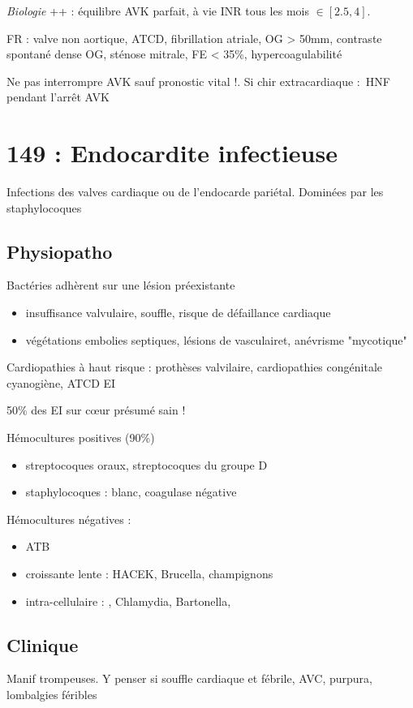 \textit{Biologie} ++ : équilibre AVK parfait, à vie \thus INR tous les mois $\in
[2.5, 4]$.

FR : valve non aortique, ATCD, fibrillation atriale, \diameter OG > 50mm,
contraste spontané dense OG, sténose mitrale, FE < 35\%, hypercoagulabilité

Ne pas interrompre AVK sauf pronostic vital !. Si chir extracardiaque : HNF
pendant l'arrêt AVK

\section{149 : Endocardite infectieuse}%
\label{sec:149_endocardite_infectieuse}
Infections des valves cardiaque ou de l'endocarde pariétal. Dominées par les
staphylocoques

\subsection{Physiopatho}
Bactéries adhèrent sur une lésion préexistante \thus
\begin{itemize}
  \item insuffisance valvulaire, souffle, risque de défaillance cardiaque
  \item végétations \thus embolies septiques, lésions de vasculairet, anévrisme
    "mycotique"
\end{itemize}

Cardiopathies à haut risque : prothèses valvilaire, cardiopathies congénitale
cyanogiène, ATCD EI

50\% des EI sur c\oe{}ur présumé sain !

Hémocultures positives (90\%)
\begin{itemize}
  \item streptocoques oraux, streptocoques du groupe D
  \item staphylocoques : blanc, coagulase négative
\end{itemize}
Hémocultures négatives :
\begin{itemize}
   \item ATB
   \item croissante lente : HACEK, Brucella, champignons
   \item intra-cellulaire : , Chlamydia, Bartonella,
\end{itemize}

\subsection{Clinique}
\danger Manif trompeuses. Y penser si souffle cardiaque et fébrile, AVC,
purpura, lombalgies féribles

